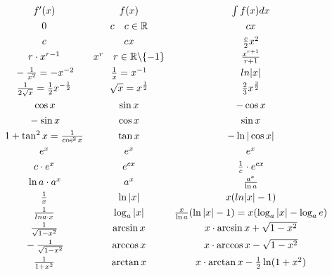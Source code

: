 \begin{equation*}
\begin{matrix}
f'(x) & f(x) & \int f(x) dx\\
\rule{0pt}{12pt}0 & c \quad c \in \mathbb{R} & cx \\
\rule{0pt}{12pt}c & cx & \frac{c}{2}x^2 \\
\rule{0pt}{12pt}r \cdot x^{r-1} & x^r \quad r \in \mathbb{R} \backslash \{-1\} & \frac{x^{r+1}}{r+1} \\
\rule{0pt}{12pt}-\frac{1}{x^2} = -x^{-2} & \frac{1}{x} = x^{-1} & ln{|x|} \\
\rule{0pt}{12pt}\frac{1}{2\sqrt{x}} = \frac{1}{2}x^{-\frac{1}{2}} & \sqrt{x} = x^{\frac{1}{2}} & \frac{2}{3}x^{\frac{3}{2}} \\
\rule{0pt}{12pt}\cos x & \sin x & -\cos x \\
\rule{0pt}{12pt}-\sin x & \cos x & \sin x \\
\rule{0pt}{12pt}1 + \tan^2 x = \frac{1}{\cos^2 x} & \tan x & -\ln |\cos x| \\
\rule{0pt}{12pt}e^x & e^x & e^x \\
\rule{0pt}{12pt}c \cdot e^x & e^{cx} & \frac{1}{c} \cdot e^{cx} \\
\rule{0pt}{12pt}\ln a \cdot a^x & a^x & \frac{a^x}{\ln a} \\
\rule{0pt}{12pt}\frac{1}{x} & \ln |x| & x(ln |x| - 1) \\
\rule{0pt}{12pt}\frac{1}{ln a \cdot x} & \log_a |x| & \frac{x}{\ln a}(\ln |x| - 1) = x(\log_a |x| - \log_a e) \\
\rule{0pt}{12pt}\frac{1}{\sqrt{1 - x^2}} & \arcsin x & x \cdot \arcsin x + \sqrt{1 - x^2} \\
\rule{0pt}{12pt}-\frac{1}{\sqrt{1 - x^2}} & \arccos x & x \cdot \arccos x - \sqrt{1 - x^2} \\
\rule{0pt}{12pt}\frac{1}{1 + x^2} & \arctan x & x \cdot \arctan x - \frac{1}{2}\ln(1 + x^2) \\
\end{matrix}
\end{equation*}
\normalsize